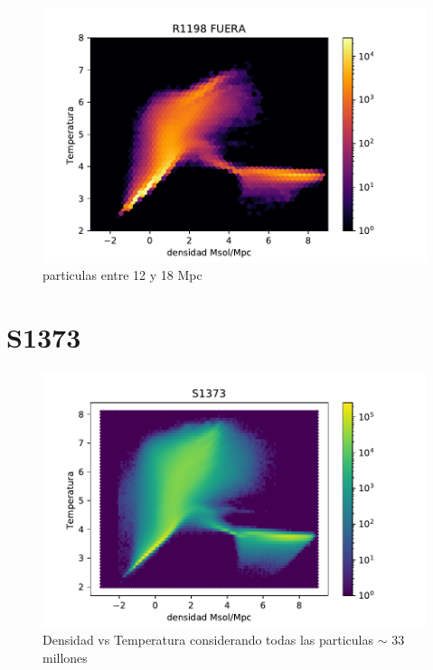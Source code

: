 \begin{figure}[h]
\centering
\includegraphics[width=18cm]{Figures/R1198_diagfase_ext.pdf}
\decoRule
\caption[Diagrama de Fase R externas]{particulas entre 12 y 18 Mpc}
\label{fig:Electron}
\end{figure}




\section{S1373}

\begin{figure}[h]
\centering
\includegraphics[width=18cm]{Figures/S1373_diagfase.pdf}
\decoRule
\caption[Diagrama de Fase TODAS particulas]{Densidad vs Temperatura considerando todas las particulas $\sim$ 33 millones}
\label{fig:Electron}
\end{figure}



